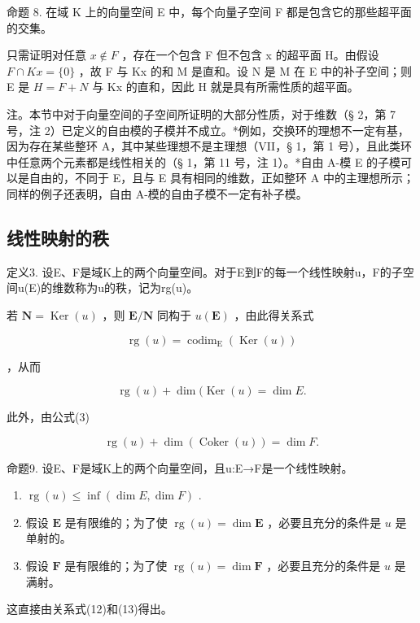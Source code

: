 命题 8. 在域 K 上的向量空间 E 中，每个向量子空间 F 都是包含它的那些超平面的交集。

只需证明对任意 \(x \notin F\) ，存在一个包含 F 但不包含 x 的超平面 H。由假设 \(F \cap Kx = \{0\}\) ，故 F 与 Kx 的和 M 是直和。设 N 是 M 在 E 中的补子空间；则 E 是 \(H = F + N\) 与 Kx 的直和，因此 H 就是具有所需性质的超平面。

注。本节中对于向量空间的子空间所证明的大部分性质，对于维数（§ 2，第 7 号，注 2）已定义的自由模的子模并不成立。*例如，交换环的理想不一定有基，因为存在某些整环 A，其中某些理想不是主理想（VII，§ 1，第 1 号），且此类环中任意两个元素都是线性相关的（§ 1，第 11 号，注 1）。*自由 A-模 E 的子模可以是自由的，不同于 E，且与 E 具有相同的维数，正如整环 A 中的主理想所示；同样的例子还表明，自由 A-模的自由子模不一定有补子模。

\subsection{线性映射的秩}

定义3. 设E、F是域K上的两个向量空间。对于E到F的每一个线性映射u，F的子空间u(E)的维数称为u的秩，记为rg(u)。

若 \(\mathbf{N} = \operatorname{Ker}(u)\) ，则 \(\mathbf{E} / \mathbf{N}\) 同构于 \(u(\mathbf{E})\) ，由此得关系式

\[
\operatorname{rg} (u) = \operatorname{codim} _ {\mathrm{E}} (\operatorname{Ker} (u))\tag{11}
\]

，从而

\[
\operatorname{rg} (u) + \dim (\operatorname{Ker} (u) = \dim E.\tag{12}
\]

此外，由公式(3)

\[
\operatorname{rg} (u) + \dim (\operatorname{Coker} (u)) = \dim F.\tag{13}
\]

命题9. 设E、F是域K上的两个向量空间，且u:E→F是一个线性映射。

\begin{enumerate}
\def\labelenumi{(\roman{enumi})}
\item
  \(\operatorname{rg}(u) \leqslant \inf(\dim E, \dim F)\) .
\item
  假设 \(\mathbf{E}\) 是有限维的；为了使 \(\operatorname{rg}(u) = \dim \mathbf{E}\) ，必要且充分的条件是 \(u\) 是单射的。
\item
  假设 \(\mathbf{F}\) 是有限维的；为了使 \(\operatorname{rg}(u) = \dim \mathbf{F}\) ，必要且充分的条件是 \(u\) 是满射。
\end{enumerate}

这直接由关系式(12)和(13)得出。

